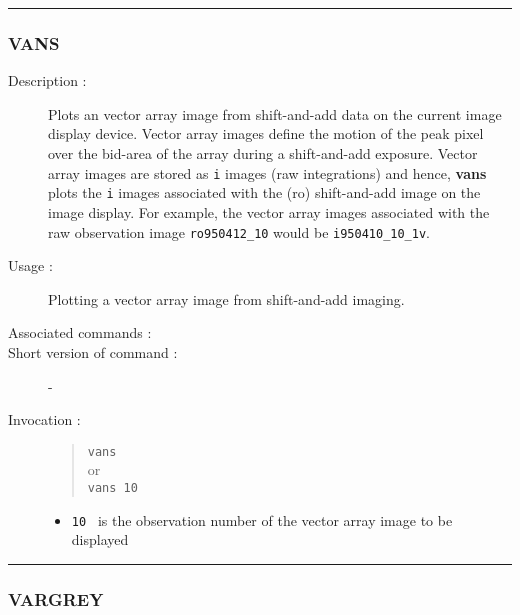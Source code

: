 \hrule 
\subsubsection*{\label{VANS}VANS}

\begin{description}

\item[Description :] Plots an vector array image from shift-and-add
data on the current image display device.  Vector array images define
the motion of the peak pixel over the bid-area of the array during a
shift-and-add exposure.  Vector array images are stored as {\tt i}
images (raw integrations) and hence, {\bf vans} plots the {\tt i}
images associated with the ({\sc ro}) shift-and-add image on the image
display.  For example, the vector array images associated with the raw
observation image {\tt ro950412\_10} would be {\tt i950410\_10\_1v}.

\item[Usage :] Plotting a vector array image from shift-and-add imaging.
\item[Associated commands :] {\tt {}}
\item[Short version of command :] -
\item[Invocation :]

\begin{quote}{\tt  vans }\\
or \\
{\tt vans 10 }
\end{quote}

\begin{itemize}

\item {\tt 10 } is the observation number of the vector array image
 to be displayed
\end{itemize}

\end{description}

\hrule 
\subsubsection*{\label{VARGREY}VARGREY}

